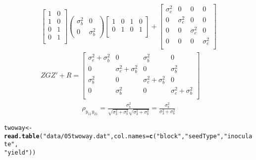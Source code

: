 \documentclass[12pt,letterpaper,oneside]{article}\usepackage{graphicx, color}
\makeatletter
\newcommand{\hlfunctioncall}[1]{\textcolor[rgb]{0.501960784313725,0,0.329411764705882}{\textbf{#1}}}%
\newcommand{\hlstring}[1]{\textcolor[rgb]{0.6,0.6,1}{#1}}%
\newenvironment{kframe}{%
 \def\at@end@of@kframe{}%
 \ifinner\ifhmode%
  \def\at@end@of@kframe{\end{minipage}}%
  \begin{minipage}{\columnwidth}%
 \fi\fi%
 \def\FrameCommand##1{\hskip\@totalleftmargin \hskip-\fboxsep
 \colorbox{shadecolor}{##1}\hskip-\fboxsep
     \hskip-\linewidth \hskip-\@totalleftmargin \hskip\columnwidth}%
 \MakeFramed {\advance\hsize-\width
   \@totalleftmargin\z@ \linewidth\hsize
   \@setminipage}}%
 {\par\unskip\endMakeFramed%
 \at@end@of@kframe}
\newenvironment{knitrout}{}{} %
\makeatother
\begin{document}
\begin{align*}
\begin{bmatrix}
        1 & 0\\
        1 & 0\\
        0 & 1\\
        0 & 1\\
\end{bmatrix}
\begin{pmatrix}
        \sigma^{2}_{b} & 0\\
        0 & \sigma^{2}_{b}
    \end{pmatrix}
    \begin{bmatrix}
        1 & 0 & 1 & 0\\
        0 & 1 & 0 & 1\\
    \end{bmatrix}
    +\begin{bmatrix}
        \sigma^{2}_{e} & 0 & 0 & 0\\
        0 & \sigma^{2}_{e} & 0 & 0\\
        0 & 0 & \sigma^{2}_{e} & 0\\
        0 & 0 & 0 & \sigma^{2}_{e}\\
    \end{bmatrix}\\
    Z G Z' + R = \begin{bmatrix}
        \sigma^{2}_{e} + \sigma^{2}_{b} & 0 & \sigma^{2}_{b} & 0\\
        0 & \sigma^{2}_{e} + \sigma^{2}_{b}  & 0 & \sigma^{2}_{b}\\
        \sigma^{2}_{b}  & 0 & \sigma^{2}_{e} + \sigma^{2}_{b} & 0 \\
        0 & \sigma^{2}_{b} & 0 & \sigma^{2}_{e} + \sigma^{2}_{b}\\
    \end{bmatrix}
\end{align*}
\begin{align*}
    \rho_{y_{11} y_{21}} = \frac{\sigma^{2}_{b}}{\sqrt{\sigma^{2}_{3} + \sigma^{2}_{b}}\sqrt{\sigma^{2}_{3} + \sigma^{2}_{b}}} =\frac{\sigma^{2}_{b}}{\sigma^{2}_{3} + \sigma^{2}_{b}}
\end{align*}
\begin{knitrout}\scriptsize
{}\color{fgcolor}\begin{kframe}
\begin{alltt}
twoway <- \hlfunctioncall{read.table}(\hlstring{"data/05twoway.dat"}, col.names = \hlfunctioncall{c}(\hlstring{"block"}, \hlstring{"seedType"}, \hlstring{"inoculate"}, 
    \hlstring{"yield"}))
\end{alltt}
\end{kframe}
\end{knitrout}
\end{document}

